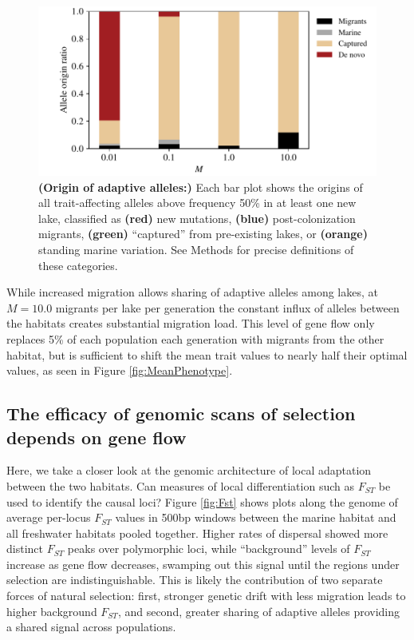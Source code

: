 \documentclass{article}
\begin{document}
\begin{figure}
    \begin{center}
    \includegraphics{Final_Plots/Allele_Origin_2.pdf}
    \caption{ 
        \textbf{(Origin of adaptive alleles:)}
        Each bar plot shows the origins
        of all trait-affecting alleles above frequency 50\% in at least one new lake,
        classified as
        \textbf{(red)} new mutations,
        \textbf{(blue)} post-colonization migrants,
        \textbf{(green)} ``captured'' from pre-existing lakes, or
        \textbf{(orange)} standing marine variation.
        See Methods for precise definitions of these categories.
    } \label{fig:Origin}
    \end{center}
\end{figure}

While increased migration allows sharing of adaptive alleles among lakes, at $M = 10.0$ migrants per lake per generation
the constant influx of alleles between the habitats creates substantial migration load. 
This level of gene flow only replaces 5\% of each population each generation with migrants from the other habitat, 
but is sufficient to shift the mean trait values to nearly half their optimal values, as seen in Figure \ref{fig:MeanPhenotype}. 


\subsection*{The efficacy of genomic scans of selection depends on gene flow}

Here, we take a closer look at the genomic architecture of local adaptation between the two habitats. 
Can measures of local differentiation such as $F_{ST}$ be used to identify the causal loci? Figure \ref{fig:Fst} shows plots along the genome of average per-locus $F_{ST}$ values in 500bp windows between the marine habitat and all freshwater habitats pooled together. 
Higher rates of dispersal showed more distinct $F_{ST}$ peaks over polymorphic loci, while ``background'' levels of $F_{ST}$ increase as gene flow decreases, swamping out this signal until the regions under selection are indistinguishable. This is likely the contribution of two separate forces of natural selection: 
first, stronger genetic drift with less migration leads to higher background $F_{ST}$, and second, greater sharing of adaptive alleles providing a shared signal across populations.
\end{document}
